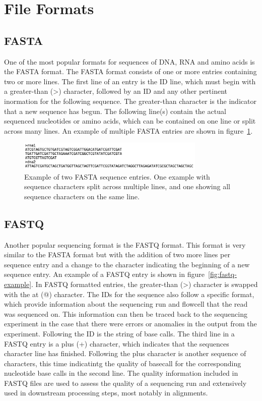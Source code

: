 \section{File Formats}

\subsection{FASTA}
One of the most popular formats for sequences of DNA, RNA and amino
acids is the FASTA format. The FASTA format consists of one or more
entries containing two or more lines. The first line of an entry is
the ID line, which must begin with a greater-than (\textgreater)
character, followed by an ID and any other pertinent inormation for
the following sequence. The greater-than character is the indicator
that a new sequence has begun. The following line(s) contain the
actual sequenced nucleotides or amino acids, which can be contained on
one line or split across many lines. An example of multiple FASTA
entries are shown in figure~\ref{fig:fasta-example}.

\begin{figure}
  \centering
  \includegraphics[width=0.8\textwidth]{figures/fasta-example.png}
  \caption{Example of two FASTA sequence entries. One example with
    sequence characters split across multiple lines, and one showing
    all sequence characters on the same line.}
  \label{fig:fasta-example}
\end{figure}

\subsection{FASTQ}
Another popular sequencing format is the FASTQ format. This format is
very similar to the FASTA format but with the addition of two more
lines per sequence entry and a change to the character indicating the
beginning of a new sequence entry. An example of a FASTQ entry is
shown in figure~\ref{fig:fastq-example}. In FASTQ formatted entries,
the greater-than (\textgreater) character is swapped with the at (@)
character. The IDs for the sequence also follow a specific format,
which provide information about the sequencing run and flowcell that
the read was sequenced on. This information can then be traced back to
the sequencing experiment in the case that there were errors or
anomalies in the output from the experiment. Following the ID is the
string of base calls. The third line in a FASTQ entry is a plus (+)
character, which indicates that the sequences character line has
finished. Following the plus character is another sequence of
characters, this time indicatintg the quality of basecall for the
corresponding nucleotide base calls in the second line. The quality
information included in FASTQ files are used to assess the quality of
a sequencing run and extensively used in downstream processing steps,
most notably in alignments.

